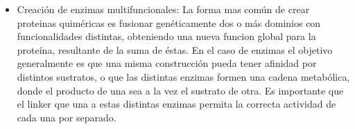 \begin{itemize}
 \item Creación de enzimas multifuncionales\cite{ljungcrantz1989construction,fan2009engineering}:
La forma mas común de crear proteinas quiméricas es fusionar genéticamente dos o más dominios con funcionalidades distintas, obteniendo una nueva funcion global para la proteína, resultante de la suma de éstas.
En el caso de enzimas el objetivo generalmente es que una misma construcción pueda tener afinidad por distintos sustratos, o que las distintas enzimas formen una cadena metabólica, donde el producto de una sea a la vez el sustrato de otra.
Es importante que el linker que una a estas distintas enzimas permita la correcta actividad de cada una por separado.


\end{itemize}

